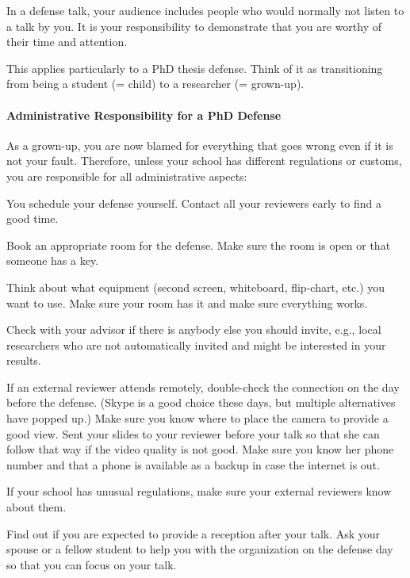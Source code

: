 \documentclass[12pt]{article}
\begin{document}
In a defense talk, your audience includes people who would normally not listen to a talk by you.
It is your responsibility to demonstrate that you are worthy of their time and attention.
\medskip

This applies particularly to a PhD thesis defense.
Think of it as transitioning from being a student (= child) to a researcher (= grown-up).

\paragraph{Administrative Responsibility for a PhD Defense}
As a grown-up, you are now blamed for everything that goes wrong even if it is not your fault.
Therefore, unless your school has different regulations or customs, you are responsible for all administrative aspects:
\begin{compactitem}
 \item You schedule your defense yourself. Contact all your reviewers early to find a good time.
 \item Book an appropriate room for the defense. Make sure the room is open or that someone has a key.
 \item Think about what equipment (second screen, whiteboard, flip-chart, etc.) you want to use.
   Make sure your room has it and make sure everything works.
 \item Check with your advisor if there is anybody else you should invite, e.g., local researchers who are not automatically invited and might be interested in your results.
 \item If an external reviewer attends remotely, double-check the connection on the day before the defense. (Skype is a good choice these days, but multiple alternatives have popped up.)
   Make sure you know where to place the camera to provide a good view.
   Sent your slides to your reviewer before your talk so that she can follow that way if the video quality is not good.
   Make sure you know her phone number and that a phone is available as a backup in case the internet is out.
 \item If your school has unusual regulations, make sure your external reviewers know about them.
 \item Find out if you are expected to provide a reception after your talk. Ask your spouse or a fellow student to help you with the organization on the defense day so that you can focus on your talk.
\end{compactitem}
\end{document}
